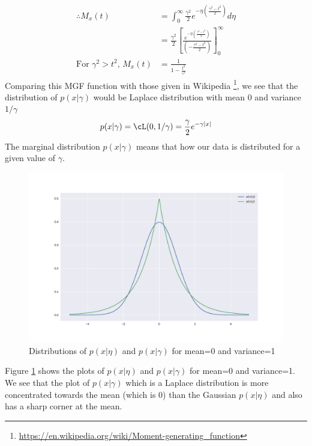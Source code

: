 \documentclass[a4paper,11pt]{article}
\begin{document}
\begin{pmisolution}
\begin{equation*}
\begin{split}
    \therefore M_x(t) &= \int_{0}^{\infty} \frac{\gamma^2}{2} e^{-\eta(\frac{\gamma^2-t^2}{2})} d\eta \\
    &= \frac{\gamma^2}{2} \left[ \frac{e^{-\eta(\frac{\gamma^2-t^2}{2})}}{(-\frac{\gamma^2-t^2}{2})} \right] _0 ^{\infty} \\
    \text{For $\gamma^2 > t^2$, } M_x(t) &= \frac{1}{1 - \frac{t^2}{\gamma^2}}
\end{split}
\end{equation*}
Comparing this MGF function with those given in Wikipedia \footnote{\href{https://en.wikipedia.org/wiki/Moment-generating\_function}{https://en.wikipedia.org/wiki/Moment-generating\_function}}, we see that the distribution of $p(x|\gamma)$ would be Laplace distribution with mean 0 and variance $1/\gamma$
\begin{equation*}
    p(x|\gamma) = \cL(0, 1/\gamma) = \frac{\gamma}{2}e^{-\gamma |x|}
\end{equation*}
The marginal distribution $p(x|\gamma)$ means that how our data is distributed for a given value of $\gamma$.

\newpage
\begin{figure}
    \centering
    \includegraphics[width=0.8\linewidth]{"plot.pdf"}
    \caption{Distributions of $p(x|\eta)$ and $p(x|\gamma)$ for mean=0 and variance=1}
    \label{fig:plt}
\end{figure}
\noindent Figure \ref{fig:plt} shows the plots of $p(x|\eta)$ and $p(x|\gamma)$ for mean=0 and variance=1. We see that the plot of $p(x|\gamma)$ which is a Laplace distribution is more concentrated towards the mean (which is 0) than the Gaussian $p(x|\eta)$ and also has a sharp corner at the mean.


\end{pmisolution}
\end{document}
